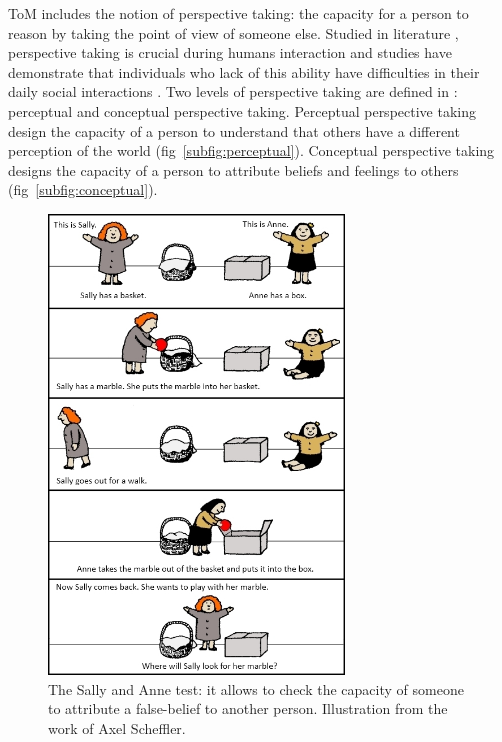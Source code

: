 \documentclass[english,a4paper,11pt,twoside]{StyleThese}
\begin{document}
ToM includes the notion of perspective taking: the capacity for a person to reason by taking the point of view of someone else. Studied in literature \cite{tversky1999speakers, flavell1992perspectives}, perspective taking is crucial during humans interaction and studies have demonstrate that individuals who lack of this ability have difficulties in their daily social interactions \cite{frick2014picturing}. Two levels of perspective taking are defined in \cite{flavell1977development}: perceptual and conceptual perspective taking. Perceptual perspective taking design the capacity of a person to understand that others have a different perception of the world (fig~\ref{subfig:perceptual}). Conceptual perspective taking designs the capacity of a person to attribute beliefs and feelings to others (fig~\ref{subfig:conceptual}).

\begin{figure}[!h]
	\centering
    \includegraphics[width=0.7\textwidth]{figs/Chapter3/sally.jpg}
    \caption{The Sally and Anne test: it allows to check the capacity of someone to attribute a false-belief to another person. Illustration from the work of Axel Scheffler.}
    \label{fig:sally}
\end{figure}
\end{document}
